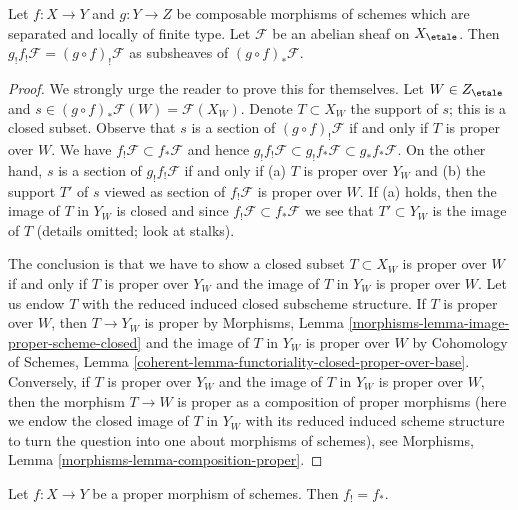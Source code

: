 \begin{lemma}
\label{lemma-f-shriek-composition}
Let $f : X \to Y$ and $g : Y \to Z$ be composable morphisms of
schemes which are separated and locally of finite type. Let
$\mathcal{F}$ be an abelian sheaf on $X_\etale$.
Then $g_!f_!\mathcal{F} = (g \circ f)_!\mathcal{F}$
as subsheaves of $(g \circ f)_*\mathcal{F}$.
\end{lemma}

\begin{proof}
We strongly urge the reader to prove this for themselves.
Let $W \in Z_\etale$ and
$s \in (g \circ f)_*\mathcal{F}(W) = \mathcal{F}(X_W)$.
Denote $T \subset X_W$ the support of $s$; this is a closed
subset. Observe that $s$ is a section of $(g \circ f)_!\mathcal{F}$
if and only if $T$ is proper over $W$. We have
$f_!\mathcal{F} \subset f_*\mathcal{F}$ and hence
$g_!f_!\mathcal{F} \subset g_!f_*\mathcal{F} \subset g_*f_*\mathcal{F}$.
On the other hand, $s$ is a section of $g_!f_!\mathcal{F}$ if and only
if (a) $T$ is proper over $Y_W$ and (b) the support $T'$ of $s$
viewed as section of $f_!\mathcal{F}$ is proper over $W$.
If (a) holds, then the image of $T$ in $Y_W$ is closed and since
$f_!\mathcal{F} \subset f_*\mathcal{F}$ we see that
$T' \subset Y_W$ is the image of $T$ (details omitted; look at stalks).

\medskip\noindent
The conclusion is that we have to show a closed subset $T \subset X_W$
is proper over $W$ if and only if $T$ is proper over $Y_W$
and the image of $T$ in $Y_W$ is proper over $W$. Let us endow $T$
with the reduced induced closed subscheme structure.
If $T$ is proper over $W$, then $T \to Y_W$ is proper by
Morphisms, Lemma \ref{morphisms-lemma-image-proper-scheme-closed}
and the image of $T$ in $Y_W$ is proper over $W$ by
Cohomology of Schemes, Lemma
\ref{coherent-lemma-functoriality-closed-proper-over-base}.
Conversely, if $T$ is proper over $Y_W$
and the image of $T$ in $Y_W$ is proper over $W$,
then the morphism $T \to W$ is proper as a composition
of proper morphisms (here we endow the closed image of $T$
in $Y_W$ with its reduced induced scheme structure to turn the
question into one about morphisms of schemes), see
Morphisms, Lemma \ref{morphisms-lemma-composition-proper}.
\end{proof}

\begin{lemma}
\label{lemma-proper-f-shriek}
Let $f : X \to Y$ be a proper morphism of schemes.
Then $f_! = f_*$.
\end{lemma}

